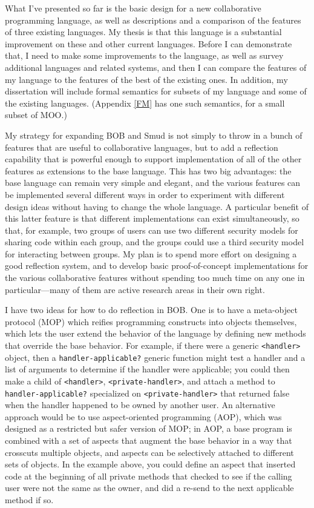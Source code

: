 \documentclass{article}
\begin{document}
What I've presented so far is the basic design for a new collaborative
programming language, as well as descriptions and a comparison of the
features of three existing languages.  My thesis is that this language
is a substantial improvement on these and other current languages.
Before I can demonstrate that, I need to make some improvements to the 
language, as well as survey additional languages and related systems,
and then I can compare the features of my language to the features of
the best of the existing ones.  In addition, my dissertation will
include formal semantics for subsets of my language and some of the
existing languages.  (Appendix \ref{FM} has one such semantics, for a
small subset of MOO.)

My strategy for expanding BOB and Smud is not simply to throw in a
bunch of features that are useful to collaborative languages, but to
add a reflection capability that is powerful enough to support
implementation of all of the other features as extensions to the base
language.  This has two big advantages: the base language can remain
very simple and elegant, and the various features can be implemented
several different ways in order to experiment with different design
ideas without having to change the whole language.  A particular
benefit of this latter feature is that different implementations can
exist simultaneously, so that, for example, two groups of users can
use two different security models for sharing code within each group,
and the groups could use a third security model for interacting
between groups.  My plan is to spend more effort on designing a good
reflection system, and to develop basic proof-of-concept
implementations for the various collaborative features without
spending too much time on any one in particular---many of them are
active research areas in their own right.

I have two ideas for how to do reflection in BOB.  One is to have a
meta-object protocol (MOP) which reifies programming constructs into
objects themselves, which lets the user extend the behavior of the
language by defining new methods that override the base behavior.  For
example, if there were a generic \texttt{<handler>} object, then a
\texttt{handler-applicable?} generic function might test a handler and
a list of arguments to determine if the handler were applicable;
you could then make a child of \texttt{<handler>},
\texttt{<private-handler>}, and attach a method to
\texttt{handler-applicable?} specialized on \texttt{<private-handler>} 
that returned false when the handler happened to be owned by another
user.  An alternative approach would be to use aspect-oriented
programming (AOP), which was designed as a restricted but safer
version of MOP; in AOP, a base program is combined with a set of
aspects that augment the base behavior in a way that crosscuts
multiple objects, and aspects can be selectively attached to different
sets of objects.  In the example above, you could define an aspect
that inserted code at the beginning of all private methods that
checked to see if the calling user were not the same as the owner, and
did a re-send to the next applicable method if so.
\end{document}
